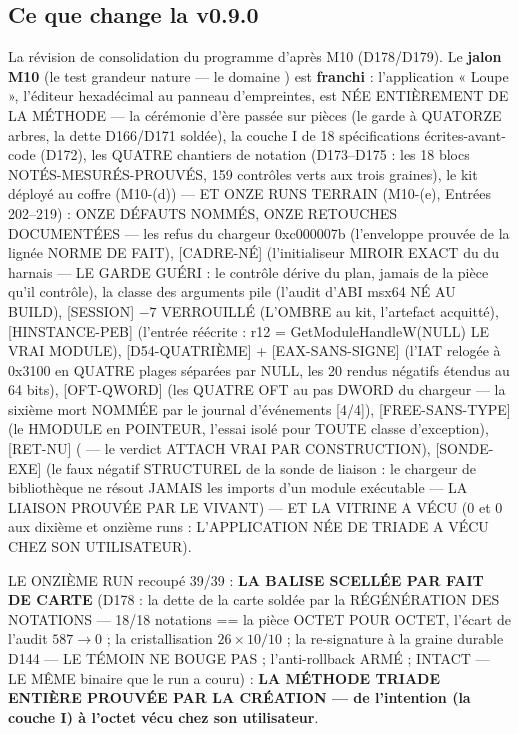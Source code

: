 \subsection{Ce que change la v0.9.0}\label{sec:nouveautes090}

La révision de consolidation du programme d'après M10 (D178/D179). Le \textbf{jalon
M10} (le test grandeur nature — le domaine ) est \textbf{franchi} :
l'application « Loupe », l'éditeur hexadécimal au panneau d'empreintes, est NÉE
ENTIÈREMENT DE LA MÉTHODE — la cérémonie d'ère passée sur pièces (le garde à
QUATORZE arbres, la dette D166/D171 soldée), la couche I de 18 spécifications
écrites-avant-code (D172), les QUATRE chantiers de notation (D173–D175 : les 18
blocs NOTÉS-MESURÉS-PROUVÉS, 159 contrôles verts aux trois graines), le kit déployé
au coffre  (M10-(d)) — ET ONZE RUNS TERRAIN (M10-(e), Entrées 202–219) :
ONZE DÉFAUTS NOMMÉS, ONZE RETOUCHES DOCUMENTÉES — les refus du chargeur
0xc000007b (l'enveloppe prouvée de la lignée NORME DE FAIT), [CADRE-NÉ]
(l'initialiseur  MIROIR EXACT du  du harnais — LE
GARDE GUÉRI : le contrôle dérive du plan, jamais de la pièce qu'il contrôle), la
classe des arguments pile (l'audit d'ABI msx64 NÉ AU BUILD), [SESSION] $-7$
VERROUILLÉ (L'OMBRE au kit, l'artefact acquitté), [HINSTANCE-PEB] (l'entrée
réécrite : r12 = GetModuleHandleW(NULL) LE VRAI MODULE), [D54-QUATRIÈME] +
[EAX-SANS-SIGNE] (l'IAT relogée à 0x3100 en QUATRE plages séparées par NULL, les 20
rendus négatifs étendus au 64 bits), [OFT-QWORD] (les QUATRE OFT au pas DWORD du
chargeur — la sixième mort NOMMÉE par le journal d'événements [4/4]),
[FREE-SANS-TYPE] (le HMODULE en POINTEUR, l'essai isolé pour TOUTE classe
d'exception), [RET-NU] ( — le verdict ATTACH VRAI PAR
CONSTRUCTION), [SONDE-EXE] (le faux négatif STRUCTUREL de la sonde de liaison : le
chargeur de bibliothèque ne résout JAMAIS les imports d'un module exécutable — LA
LIAISON PROUVÉE PAR LE VIVANT) — ET LA VITRINE A VÉCU (0 et 0 aux dixième et
onzième runs : L'APPLICATION NÉE DE TRIADE A VÉCU CHEZ SON UTILISATEUR).

LE ONZIÈME RUN recoupé 39/39 : \textbf{LA BALISE  SCELLÉE PAR
FAIT DE CARTE} (D178 : la dette de la carte soldée par la RÉGÉNÉRATION DES
NOTATIONS — 18/18 notations == la pièce OCTET POUR OCTET, l'écart de l'audit
$587 \to 0$ ; la cristallisation $26 \times 10/10$ ; la re-signature à la graine
durable D144 — LE TÉMOIN NE BOUGE PAS ; l'anti-rollback ARMÉ ; 
INTACT  — LE MÊME binaire que le run a couru) : \textbf{LA MÉTHODE
TRIADE ENTIÈRE PROUVÉE PAR LA CRÉATION — de l'intention (la couche I) à l'octet
vécu chez son utilisateur}.

